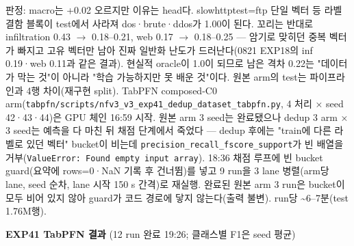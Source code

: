 판정: macro는 +\allowbreak{}0.02 오르지만 이유는 head다. slowhttptest=\allowbreak{}ftp 단일 벡터 등 라벨 결함 블록이 test에서 사라져 dos·brute·ddos가 1.00이 된다. 꼬리는 반대로 infiltration 0.43  \ensuremath{\rightarrow}  0.18–0.21, web 0.17  \ensuremath{\rightarrow}  0.18–0.25 — 암기로 맞히던 중복 벡터가 빠지고 고유 벡터만 남아 진짜 일반화 난도가 드러난다(0821 EXP18의 inf 0.19·web 0.11과 같은 결과). 현실적 oracle이 1.0이 되므로 남은 격차 0.22는 "데이터가 막는 것"이 아니라 "학습 가능하지만 못 배운 것"이다. 원본 arm의 test는 파이프라인과 4행 차이(재구현 split). TabPFN composed-C0 arm(\texttt{tabpfn/\allowbreak{}\allowbreak{}s\allowbreak{}cripts/\allowbreak{}\allowbreak{}n\allowbreak{}fv3\_\allowbreak{}\allowbreak{}v3\_\allowbreak{}\allowbreak{}e\allowbreak{}xp41\_\allowbreak{}\allowbreak{}ded\allowbreak{}up\_\allowbreak{}\allowbreak{}datas\allowbreak{}et\_\allowbreak{}\allowbreak{}tabpf\allowbreak{}n.\allowbreak{}py}, 4 처리 × seed 42·43·44)은 GPU 체인 16:59 시작. 원본 arm 3 seed는 완료됐으나 dedup 3 arm × 3 seed는 예측을 다 마친 뒤 채점 단계에서 죽었다 — dedup 후에는 "train에 다른 라벨로 있던 벡터" bucket이 비는데 \texttt{precisio\allowbreak{}n\_\allowbreak{}\allowbreak{}recall\allowbreak{}\_\allowbreak{}\allowbreak{}fscore\_\allowbreak{}\allowbreak{}support}가 빈 배열을 거부(\texttt{ValueErr\allowbreak{}or: Foun\allowbreak{}d empty \allowbreak{}input ar\allowbreak{}ray}). 18:36 채점 루프에 빈 bucket guard(요약에 rows=\allowbreak{}0·NaN 기록 후 건너뜀)를 넣고 9 run을 3 lane 병렬(arm당 lane, seed 순차, lane 시작 150 s 간격)로 재실행. 완료된 원본 arm 3 run은 bucket이 모두 비어 있지 않아 guard가 코드 경로에 닿지 않는다(출력 불변). run당 \textasciitilde{}6–7분(test 1.76M행).

\textbf{EXP41 TabPFN 결과} (12 run 완료 19:26; 클래스별 F1은 seed 평균)

